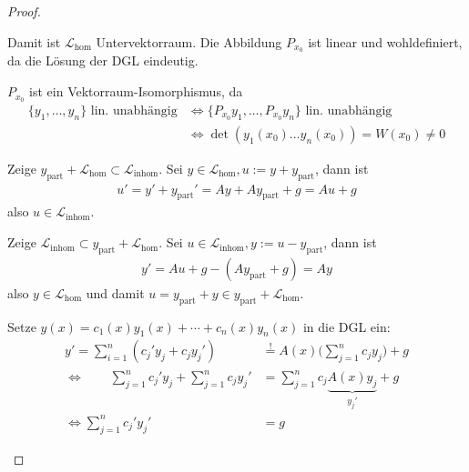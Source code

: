 \begin{theorem}[Satz]
\begin{proof}
\begin{enum-arab}
\begin{enum-alph}
        Damit ist $\mathcal L_{\text{hom}}$ Untervektorraum.
        Die Abbildung $P_{x_0}$ ist linear und wohldefiniert, da die Lösung der DGL eindeutig.
      \item
        $P_{x_0}$ ist ein Vektorraum-Isomorphismus, da
        \begin{align*}
          \{y_1, \dotsc, y_n\} \text{ lin. unabhängig}
          & \iff \{P_{x_0} y_1, \dotsc, P_{x_0} y_n \} \text{ lin. unabhängig} \\
          & \iff \det(y_1(x_0) \dotso y_n(x_0)) = W(x_0) \neq 0
        \end{align*}
      \end{enum-alph}
    \item
      \begin{enum-alph}

      \item
        Zeige $y_{\text{part}} + \mathcal L_{\text{hom}} \subset \mathcal L_{\text{inhom}}$.
        Sei $y \in \mathcal L_{\text{hom}}, u := y + y_{\text{part}}$, dann ist
        \begin{align*}
          u' = y' + y_{\text{part}}' = Ay + Ay_{\text{part}} + g = Au + g
        \end{align*}
        also $u \in \mathcal L_{\text{inhom}}$.

        Zeige $\mathcal L_{\text{inhom}} \subset y_{\text{part}} + \mathcal L_{\text{hom}}$.
        Sei $u \in \mathcal L_{\text{inhom}}, y := u - y_{\text{part}}$, dann ist
        \begin{align*}
          y' = Au + g - (A y_{\text{part}} + g) = Ay
        \end{align*}
        also $y \in \mathcal L_{\text{hom}}$ und damit $u = y_{\text{part}} + y \in y_{\text{part}} + \mathcal L_{\text{hom}}$.
      \item
        Setze $y(x) = c_1(x) y_1(x) + \dotsb + c_n(x) y_n(x)$ in die DGL ein:
        \begin{align*}
          y' = \sum_{i=1}^n (c_j' y_j + c_j y_j') &\stackrel != A(x) \bigg( \sum_{j=1}^n c_j y_j \bigg) + g \\
          \iff \qquad \sum_{j=1}^n c_j'y_j + \sum_{j=1}^n c_j y_j' &= \sum_{j=1}^n c_j \underbrace{A(x) y_j}_{y_j'} + g \\
          \iff \sum_{j=1}^n c_j' y_j' &= g
        \end{align*}
      \end{enum-alph}
    \end{enum-arab}
  \end{proof}
\end{theorem}

